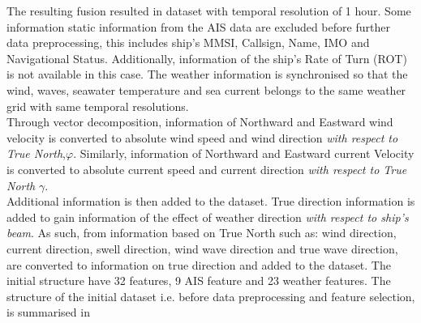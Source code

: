 The resulting fusion resulted in dataset with temporal resolution of 1 hour. Some information static information from the AIS data are excluded before further data preprocessing, this includes ship's MMSI, Callsign, Name, IMO and Navigational Status. Additionally, information of the ship's Rate of Turn (ROT) is not available in this case. The weather information is synchronised so that the wind, waves, seawater temperature and sea current belongs to the same weather grid with same temporal resolutions.\\ 

Through vector decomposition, information of Northward and Eastward wind velocity is converted to absolute wind speed and wind direction \emph{with respect to True North},$\varphi$. Similarly, information of Northward and Eastward current Velocity is converted to absolute current speed and current direction \emph{with respect to True North} $\gamma$.\\ 

Additional information is then added to the dataset. True direction information is added to gain information of the effect of weather direction \emph{with respect to ship's beam}. As such, from information based on True North such as: wind direction, current direction, swell direction, wind wave direction and true wave direction, are converted to information on true direction and added to the dataset. The initial structure have 32 features, 9 AIS feature and 23 weather features. The structure of the initial dataset i.e. before data preprocessing and feature selection, is summarised in  \\

